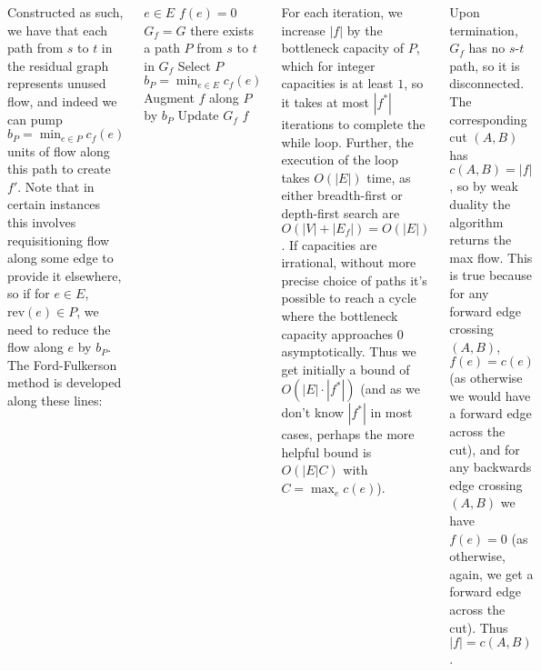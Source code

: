 \documentclass{tikzposter} %
\begin{document}
\begin{columns}
{  Constructed as such, we have that each path from $s$ to $t$ in the residual graph represents unused flow, and indeed we can pump $b_{P} = \min_{e \in P} c_{f}(e)$ units of flow along this path to create $f'$. Note that in certain instances this involves requisitioning flow along some edge to provide it elsewhere, so if for $e \in E$, $\mathrm{rev}(e) \in P$, we need to reduce the flow along $e$ by $b_{P}$. \\

  The Ford-Fulkerson method is developed along these lines:
  \begin{codebox}
  \li \For $e \in E$ \Do
  \li   $f(e) = 0$
      \End
  \li $G_{f} = G$
  \li \While there exists a path $P$ from $s$ to $t$ in $G_{f}$ \Do
  \li   Select $P$
  \li   $\displaystyle b_{P} = \min_{e \in E} c_{f}(e)$
  \li   Augment $f$ along $P$ by $b_{P}$
  \li   Update $G_{f}$
      \End
  \li \Return $f$
  \end{codebox}

  For each iteration, we increase $|f|$ by the bottleneck capacity of $P$, which for integer capacities is at least $1$, so it takes at most $|f^{*}|$ iterations to complete the while loop. Further, the execution of the loop takes $O(|E|)$ time, as either breadth-first or depth-first search are $O(|V|+|E_{f}|) = O(|E|)$. If capacities are irrational, without more precise choice of paths it's possible to reach a cycle where the bottleneck capacity approaches $0$ asymptotically. Thus we get initially a bound of $O(|E|\cdot|f^{*}|)$ (and as we don't know $|f^{*}|$ in most cases, perhaps the more helpful bound is $O(|E|C)$ with $C = \max_{e} c(e)$).\\

  \hphantom{}

  Upon termination, $G_{f}$ has no $s$-$t$ path, so it is disconnected. The corresponding cut $(A,B)$ has $c(A, B) = |f|$, so by weak duality the algorithm returns the max flow. This is true because for any forward edge crossing $(A,B)$, $f(e) = c(e)$ (as otherwise we would have a forward edge across the cut), and for any backwards edge crossing $(A,B)$ we have $f(e) = 0$ (as otherwise, again, we get a forward edge across the cut). Thus $|f| = c(A,B)$.\\

}
\end{columns}
\end{document}
